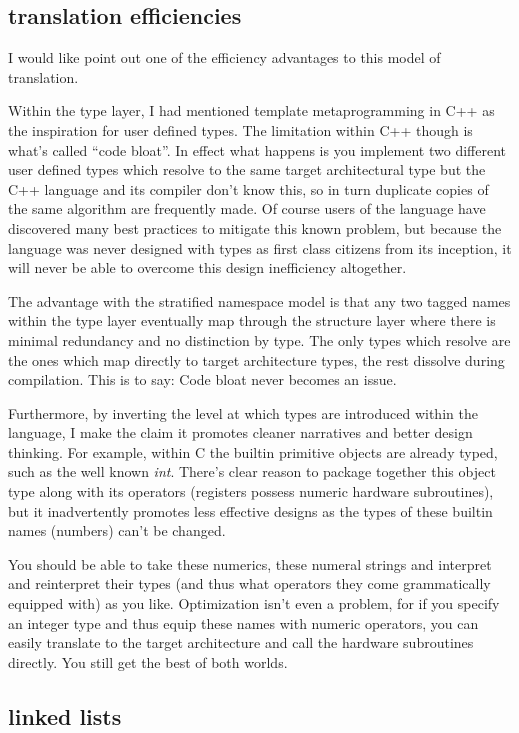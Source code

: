 \documentclass[twoside]{article}
\begin{document}
\subsection*{translation efficiencies}

I would like point out one of the efficiency advantages to this model of translation.

Within the type layer, I had mentioned template metaprogramming in C++ as the inspiration for user defined types.
The limitation within C++ though is what's called ``code bloat''. In effect what happens is you implement two different
user defined types which resolve to the same target architectural type but the C++ language and its compiler don't know
this, so in turn duplicate copies of the same algorithm are frequently made. Of course users of the language have
discovered many best practices to mitigate this known problem, but because the language was never designed with types
as first class citizens from its inception, it will never be able to overcome this design inefficiency altogether.

The advantage with the stratified namespace model is that any two tagged names within the type layer eventually map
through the structure layer where there is minimal redundancy and no distinction by type. The only types which resolve
are the ones which map directly to target architecture types, the rest dissolve during compilation. This is to say:
Code bloat never becomes an issue.

Furthermore, by inverting the level at which types are introduced within the language, I make the claim it promotes
cleaner narratives and better design thinking. For example, within C the builtin primitive objects are already typed,
such as the well known \emph{int}. There's clear reason to package together this object type along with its operators
(registers possess numeric hardware subroutines), but it inadvertently promotes less effective designs as the types
of these builtin names (numbers) can't be changed.

You should be able to take these numerics, these numeral strings and interpret and reinterpret their types (and thus
what operators they come grammatically equipped with) as you like. Optimization isn't even a problem, for if you specify
an integer type and thus equip these names with numeric operators, you can easily translate to the target architecture
and call the hardware subroutines directly. You still get the best of both worlds.

\subsection*{linked lists}
\end{document}
